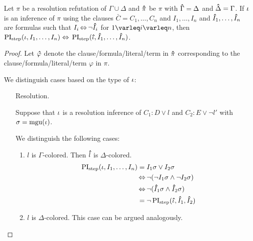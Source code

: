 \begin{lemma}
	\label{lemma:symmetry_step}
	Let $\pi$ be a resolution refutation of $\Gamma \cup \Delta$ and
	$\bm\hat{\pi}$ be $\pi$ with $\bm\hat{\Gamma} = \Delta$ and $\bm\hat{\Delta} = \Gamma$.
	If $\iota$ is an inference of $\pi$ using the clauses $\bar C = C_1, \dots, C_n$ and
	$I_1, \dots, I_n$ and 
	$\bm\hat{I}_1, \dots, \bm\hat{I}_n$ are formulas  
	such that $I_i \operatorname{\Leftrightarrow} \lnot \bm\hat{I}_i$ for $1\varleq i \varleq n$, then
	$\operatorname{PI}_{\mathrm{step}}(\iota, I_1, \dots, I_n) \;{\operatorname{\Leftrightarrow}}\; \operatorname{PI}_{\mathrm{step}}(\bm\hat{\iota}, \bm\hat{I}_1, \dots, \bm\hat{I}_n)$.
\end{lemma}
\begin{proof}
	Let $\bm\hat{\varphi}$ denote the clause/formula/literal/term in $\bm\hat{\pi}$ corresponding to the clause/formula/literal/term $\varphi$ in $\pi$.

	We distinguish cases based on the type of $\iota$:

	\begin{itemize}
		\item[Resolution.]
			\newcommand{\p}[1]{\primex{#1}}

			Suppose that $\iota$ is a resolution inference of $C_1: D \lor l$ and $C_2: E \lor \lnot l'$ with $\sigma = \operatorname{mgu}(\iota)$.

			We distinguish the following cases:
			\begin{enumerate}
				\item $l$ is $\Gamma$-colored. Then $\bm\hat{l}$ is $\Delta$-colored.
					\begin{align*}
						\PIstep(\inference, I_1, \dots, I_n) &= I_1\sigma \lor I_2\sigma\\
													 &\semiff \lnot ( \lnot I_1\sigma \land \lnot I_2\sigma )\\
														&\semiff \lnot ( \p I_1\sigma \land \p I_2\sigma ) \\
														&= \lnot \PIstep(\primex \inference, \p I_1, \p I_2)  
					\end{align*}
				\item $l$ is $\Delta$-colored. This case can be argued analogously.


\end{enumerate}
\end{itemize}
\end{proof}
